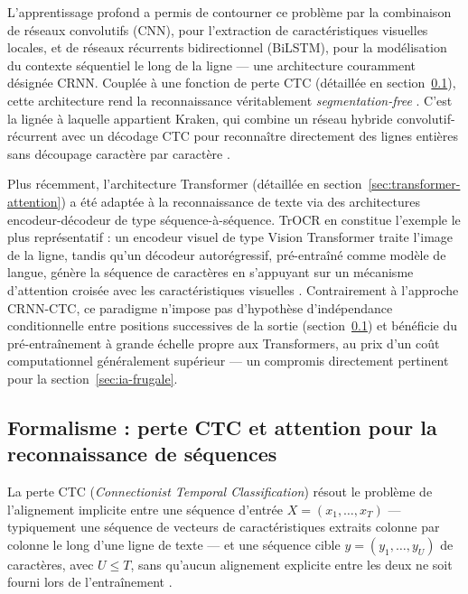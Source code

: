 L'apprentissage profond a permis de contourner ce problème par la combinaison de réseaux convolutifs (CNN), pour l'extraction de caractéristiques visuelles locales, et de réseaux récurrents bidirectionnel (BiLSTM), pour la modélisation du contexte séquentiel le long de la ligne --- une architecture couramment désignée CRNN.
Couplée à une fonction de perte CTC (détaillée en section~\ref{sec:formalisme-ctc-attention}), cette architecture rend la reconnaissance véritablement \textit{segmentation-free} \cite{graves2006ctc,gravesOfflineHandwritingRecognition2008}.
C'est la lignée à laquelle appartient Kraken, qui combine un réseau hybride convolutif-récurrent avec un décodage CTC pour reconnaître directement des lignes entières sans découpage caractère par caractère \cite{kiessling2019kraken}.

Plus récemment, l'architecture Transformer (détaillée en section~\ref{sec:transformer-attention}) a été adaptée à la reconnaissance de texte via des architectures encodeur-décodeur de type séquence-à-séquence.
TrOCR en constitue l'exemple le plus représentatif : un encodeur visuel de type Vision Transformer traite l'image de la ligne, tandis qu'un décodeur autorégressif, pré-entraîné comme modèle de langue, génère la séquence de caractères en s'appuyant sur un mécanisme d'attention croisée avec les caractéristiques visuelles \cite{li2023trocr}.
Contrairement à l'approche CRNN-CTC, ce paradigme n'impose pas d'hypothèse d'indépendance conditionnelle entre positions successives de la sortie (section~\ref{sec:formalisme-ctc-attention}) et bénéficie du pré-entraînement à grande échelle propre aux Transformers, au prix d'un coût computationnel généralement supérieur --- un compromis directement pertinent pour la section~\ref{sec:ia-frugale}.

\subsection{Formalisme : perte CTC et attention pour la reconnaissance de séquences}
\label{sec:formalisme-ctc-attention}

La perte CTC (\textit{Connectionist Temporal Classification}) résout le problème de l'alignement implicite entre une séquence d'entrée $X = (x_1, \dots, x_T)$ --- typiquement une séquence de vecteurs de caractéristiques extraits colonne par colonne le long d'une ligne de texte --- et une séquence cible $y = (y_1, \dots, y_U)$ de caractères, avec $U \leq T$, sans qu'aucun alignement explicite entre les deux ne soit fourni lors de l'entraînement \cite{graves2006ctc}.

